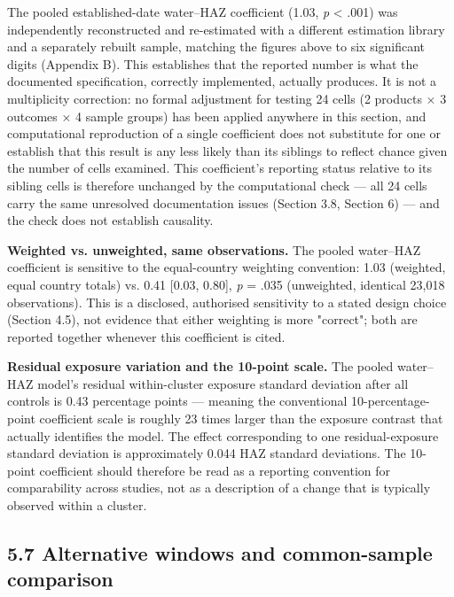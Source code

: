 The pooled established-date water--HAZ coefficient (1.03, \textit{p} < .001) was independently reconstructed and re-estimated with a different estimation library and a separately rebuilt sample, matching the figures above to six significant digits (Appendix B). This establishes that the reported number is what the documented specification, correctly implemented, actually produces. It is not a multiplicity correction: no formal adjustment for testing 24 cells (2 products × 3 outcomes × 4 sample groups) has been applied anywhere in this section, and computational reproduction of a single coefficient does not substitute for one or establish that this result is any less likely than its siblings to reflect chance given the number of cells examined. This coefficient's reporting status relative to its sibling cells is therefore unchanged by the computational check --- all 24 cells carry the same unresolved documentation issues (Section 3.8, Section 6) --- and the check does not establish causality.

\textbf{Weighted vs. unweighted, same observations.} The pooled water--HAZ coefficient is sensitive to the equal-country weighting convention: 1.03 (weighted, equal country totals) vs. 0.41 [0.03, 0.80], \textit{p} = .035 (unweighted, identical 23,018 observations). This is a disclosed, authorised sensitivity to a stated design choice (Section 4.5), not evidence that either weighting is more "correct"; both are reported together whenever this coefficient is cited.

\textbf{Residual exposure variation and the 10-point scale.} The pooled water--HAZ model's residual within-cluster exposure standard deviation after all controls is 0.43 percentage points --- meaning the conventional 10-percentage-point coefficient scale is roughly 23 times larger than the exposure contrast that actually identifies the model. The effect corresponding to one residual-exposure standard deviation is approximately 0.044 HAZ standard deviations. The 10-point coefficient should therefore be read as a reporting convention for comparability across studies, not as a description of a change that is typically observed within a cluster.

\subsection*{5.7 Alternative windows and common-sample comparison}

